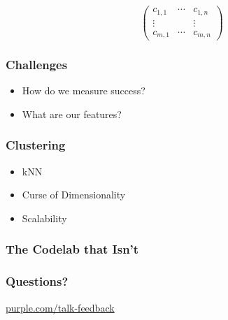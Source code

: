\begin{frame}
{\begin{displaymath}
\begin{pmatrix}
        c_{1,1} & \cdots & c_{1,n} \\
        \vdots & & \vdots \\
        c_{m,1} & \cdots & c_{m,n}
      \end{pmatrix}
    \end{displaymath}
  }
  
\end{frame}

\begin{frame}
  \frametitle{Challenges}

  \begin{itemize}
  \item How do we measure success?
  \item What are our features?
  \end{itemize}
\end{frame}

\begin{frame}
  \frametitle{Clustering}

  \begin{itemize}
  \item kNN 
  \item Curse of Dimensionality
  \item Scalability 
  \end{itemize}
\end{frame}

\begin{frame}
  \frametitle{The Codelab that Isn't}


\end{frame}


\begin{frame}
  \frametitle{Questions?}
  \centerline{\large\url{purple.com/talk-feedback}}
\end{frame}


